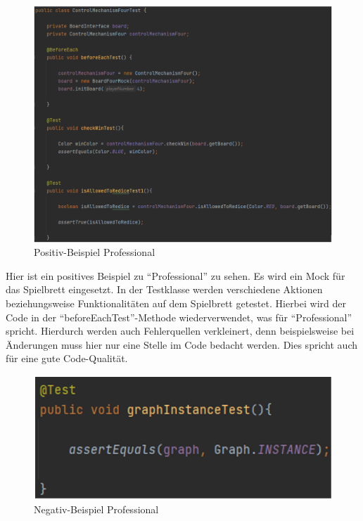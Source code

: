 \begin{figure}[htbp]
\centering
\centerline{\includegraphics[scale=.5]{professional}}
\caption{Positiv-Beispiel Professional}
\label{fig:professional}
\end{figure}

\noindent Hier ist ein positives Beispiel zu \enquote{Professional} zu sehen. Es wird ein Mock für das Spielbrett eingesetzt. In der Testklasse werden verschiedene Aktionen beziehungsweise Funktionalitäten auf dem Spielbrett getestet. Hierbei wird der Code in der \enquote{beforeEachTest}-Methode wiederverwendet, was für \enquote{Professional} spricht. Hierdurch werden auch Fehlerquellen verkleinert, denn beispielsweise bei Änderungen muss hier nur eine Stelle im Code bedacht werden. Dies spricht auch für eine gute Code-Qualität.

\newpage

\begin{figure}[htbp]
\centering
\centerline{\includegraphics[scale=.5]{notprofessional}}
\caption{Negativ-Beispiel Professional}
\label{fig:notprofessional}
\end{figure}

